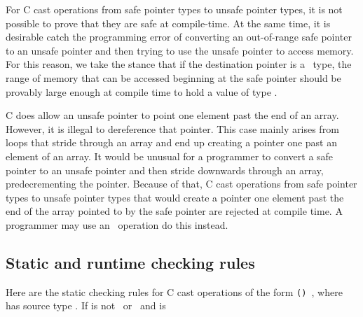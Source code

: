For C cast operations from safe pointer types to unsafe pointer types,
it is not possible to prove that they are safe at compile-time.   At the same
time, it is desirable catch the programming error of converting an out-of-range
safe pointer to an unsafe pointer and then trying to use the unsafe
pointer to access memory.  For this reason, we take the stance that if the
destination pointer is a \unsafeptrT\ type, the range of memory that can be accessed
beginning at the safe pointer should be provably large enough at compile time 
to hold a value of type .

C does allow an unsafe pointer to point one element past the end of an array.
However, it is illegal to dereference that pointer.  This case mainly arises
from loops that stride through an array and end up creating a pointer one past
an element of an array.  It would be unusual for a programmer to
convert a safe pointer to an unsafe pointer and then stride downwards through an array, 
predecrementing the pointer.  Because of that, C cast operations from safe pointer
types to unsafe pointer types that would create a pointer one element past
the end of the array pointed to by the safe pointer are rejected at compile time.
A programmer may use an \assumeboundscast\ operation do this instead.

\subsection{Static and runtime checking rules}

Here are the static checking rules for C cast operations of the form \texttt{() },
where  has source type . If
 is not \ptrvoid\ or \unsafeptrvoid\ and  is

